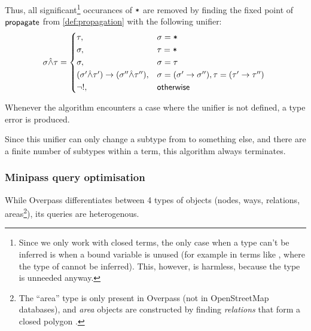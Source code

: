 \documentclass[main.tex]{subfiles}
\begin{document}
Thus, all significant\footnote{
    Since we only work with closed terms, the only case when a type can't be
    inferred is when a bound variable is unused (for example in terms like
    , where the type of  cannot be inferred).
    This, however, is harmless, because the type is unneeded anyway.
} occurances of $\mbox{\texttt{*}}$ are removed by finding the fixed point of
$\mathsf{propagate}$ from \cref{def:propagation}
with the following unifier:
\[
    \sigma \unify \tau =
    \begin{cases*}
        \tau ,& $\sigma = \text{\code{*}}$ \\
        \sigma ,& $\tau = \text{\code{*}}$ \\
        \sigma ,& $\sigma = \tau$ \\
        (\sigma' \unify \tau') \tot (\sigma'' \unify \tau'') ,&
            $\sigma = (\sigma' \tot \sigma''), \tau = (\tau' \tot \tau'')$ \\
        \lnot ! ,& $\mathsf{otherwise}$ \\
    \end{cases*}
\]

Whenever the algorithm encounters a case where the unifier is not defined,
a type error is produced.

Since this unifier can only change a subtype from \code{*} to something else,
and there are a finite number of subtypes within a term, this algorithm
always terminates.

\subsubsection{Minipass query optimisation}
\label{sec:optimisation}
While Overpass differentiates between 4 types of objects (nodes, ways, relations,
areas\footnote{
    The ``area'' type is only present in Overpass (not in OpenStreetMap
    databases), and \emph{area} objects are constructed by finding \emph{relations}
    that form a closed polygon \cite{overpass}.
}), its queries are heterogenous.
\end{document}
